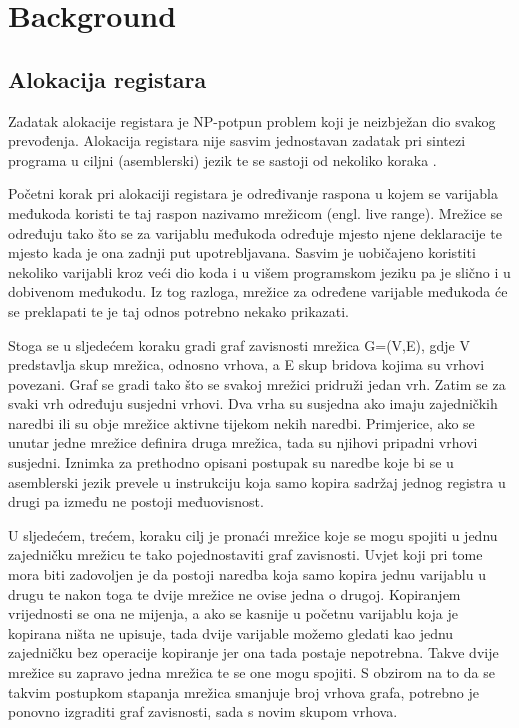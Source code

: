 \documentclass[hidelinks, conference]{IEEEtran}
\begin{document}
\section{Background}

\subsection{Alokacija registara}

Zadatak alokacije registara je NP-potpun problem koji je neizbježan dio svakog prevođenja. Alokacija registara nije sasvim jednostavan zadatak pri sintezi programa u ciljni (asemblerski) jezik te se sastoji od nekoliko koraka \cite{b1}.

Početni korak pri alokaciji registara je određivanje raspona u kojem se varijabla međukoda koristi te taj raspon nazivamo mrežicom (engl. live range). Mrežice se određuju tako što se za varijablu međukoda određuje mjesto njene deklaracije te mjesto kada je ona zadnji put upotrebljavana. Sasvim je uobičajeno koristiti nekoliko varijabli kroz veći dio koda i u višem programskom jeziku pa je slično i u dobivenom međukodu. Iz tog razloga, mrežice za određene varijable međukoda će se preklapati te je taj odnos potrebno nekako prikazati.

Stoga se u sljedećem koraku gradi graf zavisnosti mrežica G=(V,E), gdje V predstavlja skup mrežica, odnosno vrhova, a E skup bridova kojima su vrhovi povezani. Graf se gradi tako što se svakoj mrežici pridruži jedan vrh. Zatim se za svaki vrh određuju susjedni vrhovi. Dva vrha su susjedna ako imaju zajedničkih naredbi ili su obje mrežice aktivne tijekom nekih naredbi. Primjerice, ako se unutar jedne mrežice definira druga mrežica, tada su njihovi pripadni vrhovi susjedni. Iznimka za prethodno opisani postupak su naredbe koje bi se u asemblerski jezik prevele u instrukciju koja samo kopira sadržaj jednog registra u drugi pa između ne postoji međuovisnost.

U sljedećem, trećem, koraku cilj je pronaći mrežice koje se mogu spojiti u jednu zajedničku mrežicu te tako pojednostaviti graf zavisnosti. Uvjet koji pri tome mora biti zadovoljen je da postoji naredba koja samo kopira jednu varijablu u drugu te nakon toga te dvije mrežice ne ovise jedna o drugoj. Kopiranjem vrijednosti se ona ne mijenja, a ako se kasnije u početnu varijablu koja je kopirana ništa ne upisuje, tada dvije varijable možemo gledati kao jednu zajedničku bez operacije kopiranje jer ona tada postaje nepotrebna. Takve dvije mrežice su zapravo jedna mrežica te se one mogu spojiti. S obzirom na to da se takvim postupkom stapanja mrežica smanjuje broj vrhova grafa, potrebno je ponovno izgraditi graf zavisnosti, sada s novim skupom vrhova.
\end{document}
